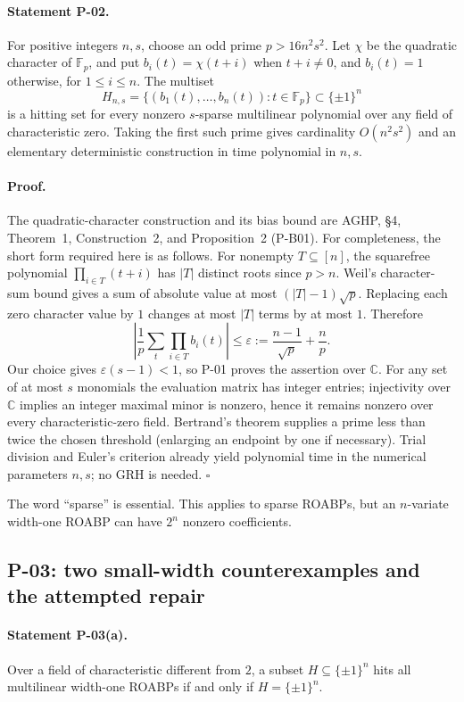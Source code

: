 \paragraph{Statement P-02.}
For positive integers $n,s$, choose an odd prime $p>16n^2s^2$. Let $\chi$ be the quadratic character of $\mathbb F_p$, and put $b_i(t)=\chi(t+i)$ when $t+i\ne0$, and $b_i(t)=1$ otherwise, for $1\le i\le n$. The multiset
\[
 H_{n,s}=\{(b_1(t),\ldots,b_n(t)):t\in\mathbb F_p\}\subset\{\pm1\}^n
\]
is a hitting set for every nonzero $s$-sparse multilinear polynomial over any field of characteristic zero. Taking the first such prime gives cardinality $O(n^2s^2)$ and an elementary deterministic construction in time polynomial in $n,s$.
\paragraph{Proof.}
The quadratic-character construction and its bias bound are AGHP, \S4, Theorem~1, Construction~2, and Proposition~2 (P-B01). For completeness, the short form required here is as follows. For nonempty $T\subseteq[n]$, the squarefree polynomial $\prod_{i\in T}(t+i)$ has $|T|$ distinct roots since $p>n$. Weil's character-sum bound gives a sum of absolute value at most $(|T|-1)\sqrt p$. Replacing each zero character value by $1$ changes at most $|T|$ terms by at most $1$. Therefore
\[
 \left|\frac1p\sum_t\prod_{i\in T}b_i(t)\right|
 \le \varepsilon:=\frac{n-1}{\sqrt p}+\frac np.
\]
Our choice gives $\varepsilon(s-1)<1$, so P-01 proves the assertion over $\mathbb C$. For any set of at most $s$ monomials the evaluation matrix has integer entries; injectivity over $\mathbb C$ implies an integer maximal minor is nonzero, hence it remains nonzero over every characteristic-zero field. Bertrand's theorem supplies a prime less than twice the chosen threshold (enlarging an endpoint by one if necessary). Trial division and Euler's criterion already yield polynomial time in the numerical parameters $n,s$; no GRH is needed. $\square$

The word ``sparse'' is essential. This applies to sparse ROABPs, but an $n$-variate width-one ROABP can have $2^n$ nonzero coefficients.

\subsection{P-03: two small-width counterexamples and the attempted repair}
\paragraph{Statement P-03(a).}
Over a field of characteristic different from $2$, a subset $H\subseteq\{\pm1\}^n$ hits all multilinear width-one ROABPs if and only if $H=\{\pm1\}^n$.
